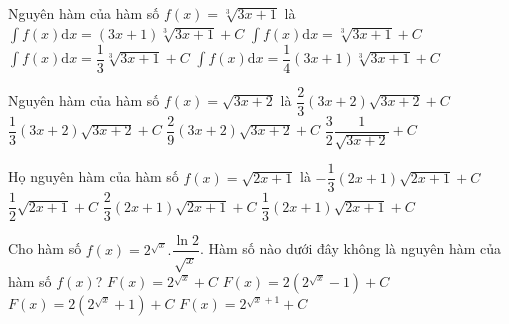 \begin{ex}
	Nguyên hàm của hàm số $ f(x)=\sqrt[3]{3x+1}$ là
	\choice
	{$\displaystyle\int{f(x)\mathrm{d}x}=\left(3x+1\right)\sqrt[3]{3x+1}+C$}
	{$\displaystyle\int{f(x)\mathrm{d}x}=\sqrt[3]{3x+1}+C$}
	{$\displaystyle\int{f(x)\mathrm{d}x}=\dfrac{1}{3}\sqrt[3]{3x+1}+C$}
	{\True $\displaystyle\int{f(x)\mathrm{d}x}=\dfrac{1}{4}\left(3x+1\right)\sqrt[3]{3x+1}+C$}
\end{ex}
\begin{ex}
	Nguyên hàm của hàm số $ f(x)=\sqrt{3x+2}$ là
	\choice
	{$\dfrac{2}{3}(3x+2)\sqrt{3x+2}+C$}
	{$\dfrac{1}{3}(3x+2)\sqrt{3x+2}+C$}
	{\True $\dfrac{2}{9}(3x+2)\sqrt{3x+2}+C$}
	{$\dfrac{3}{2}\dfrac{1}{\sqrt{3x+2}}+C$}
\end{ex}
\begin{ex}
	Họ nguyên hàm của hàm số $ f(x)=\sqrt{2x+1}$ là
	\choice
	{$-\dfrac{1}{3}\left(2x+1\right)\sqrt{2x+1}+C$}
	{$\dfrac{1}{2}\sqrt{2x+1}+C$}
	{$\dfrac{2}{3}\left(2x+1\right)\sqrt{2x+1}+C$}
	{\True $\dfrac{1}{3}\left(2x+1\right)\sqrt{2x+1}+C$}
\end{ex}
\begin{ex}
	Cho hàm số $f(x)=2^{\sqrt{x}}.\dfrac{\ln 2}{\sqrt{x}}$. Hàm số nào dưới đây không là nguyên hàm của hàm số $f(x)$?
	\choice
	{\True $ F(x)=2^{\sqrt{x}}+C$}
	{$F(x)=2\left(2^{\sqrt{x}}-1\right)+C$}
	{$F(x)=2\left(2^{\sqrt{x}}+1\right)+C$}
	{$ F(x)=2^{\sqrt{x}+1}+C$}
\end{ex}
